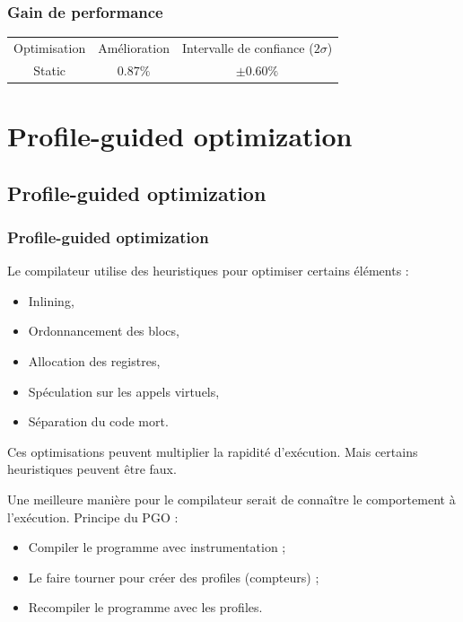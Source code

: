 \documentclass{beamer}
\begin{document}
\begin{frame}[fragile]
    \frametitle{Gain de performance}

    \begin{center}
        \begin{tabular}{ c c c }
            Optimisation & Amélioration & Intervalle de confiance ($2\sigma$) \\
            Static       & $0.87\%$     & $\pm 0.60\%$
        \end{tabular}
    \end{center}
\end{frame}

\section{Profile-guided optimization}

\begin{frame}
    \tableofcontents[currentsection]
\end{frame}

\subsection{Profile-guided optimization}

\begin{frame}
    \frametitle{Profile-guided optimization}

    Le compilateur utilise des heuristiques pour optimiser certains éléments :
    \begin{itemize}
        \item Inlining,
        \item Ordonnancement des blocs,
        \item Allocation des registres,
        \item Spéculation sur les appels virtuels,
        \item Séparation du code mort.
    \end{itemize}
    Ces optimisations peuvent multiplier la rapidité d'exécution.
    Mais certains heuristiques peuvent être faux.
\end{frame}

\begin{frame}
    Une meilleure manière pour le compilateur serait de connaître le comportement à l'exécution.
    Principe du PGO :
    \begin{itemize}
        \item Compiler le programme avec instrumentation ;
        \item Le faire tourner pour créer des profiles (compteurs) ;
        \item Recompiler le programme avec les profiles.
    \end{itemize}
\end{frame}
\end{document}
